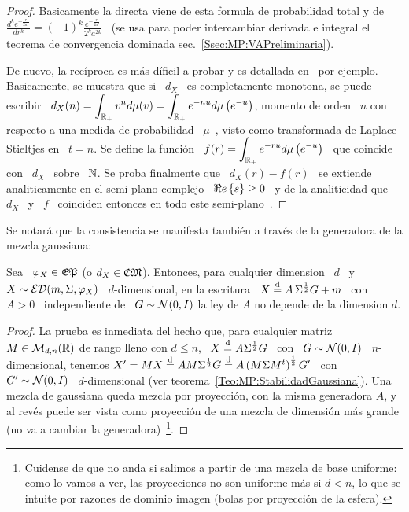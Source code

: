 \begin{proof}
  Basicamente la  directa viene  de esta  formula de probabilidad  total y  de \
  $\displaystyle     \frac{d^k    e^{-\frac{r}{2    a^2}}}{dr^k}     =    (-1)^k
  \frac{e^{-\frac{r}{2 a^2}}}{2^k  a^{2 k}}$ \  (se usa para  poder intercambiar
  derivada    e     integral    el    teorema     de    convergencia    dominada
  sec.~\ref{Ssec:MP:VAPreliminaria}).

  De  nuevo,  la  rec\'iproca  es  m\'as  d\'ificil  a  probar  y  es  detallada
  en~\cite[\S~12]{Wid46} por ejemplo.  Basicamente, se  muestra que si \ $d_X$ \
  es  completamente  monotona,  se  puede  escribir \  $\displaystyle  d_X(n)  =
  \int_{\mathbb{R}_+}  v^n  d\mu(v)  =  \int_{\mathbb{R}_+}  e^{-n  u}  d\mu\left(  e^{-u}
  \right)$, momento de  orden \ $n$ con respecto a una  medida de probabilidad \
  $\mu$~\cite{Hau21:I, Hau21:II},  visto como transformada  de Laplace-Stieltjes
  en \ $t  = n$.  Se define la funci\'on \  $\displaystyle f(r) = \int_{\mathbb{R}_+}
  e^{- r  u} d\mu\left( e^{-u}  \right)$ \  que coincide con  \ $d_X$ \  sobre \
  $\mathbb{N}$.   Se  proba   finalmente  que  \  $d_X(r)  -   f(r)$  \  se  extiende
  analiticamente  en el  semi  plano  complejo \  $\Re e \left\{ s \right\}  \ge 0$  \  y de  la
  analiticidad  que  \ $d_X$  \  y  \ $f$  \  coinciden  entonces  en todo  este
  semi-plano~\cite{Car21, CarKro05}.
\end{proof}

Se  notar\'a  que  la consistencia  se  manifesta  tambi\'en  a trav\'es  de  la
generadora de la mezcla gaussiana:
%
\begin{lema}\label{Lem:MP:AIndependienteD}
  Sea  \ $\varphi_X  \in  \mathfrak{EP}$ (o  $d_X  \in \mathfrak{CM}$).  Entonces, para  cualquier
  dimension \ $d$ \ y  $X \sim \mathcal{ED}(m,\Sigma,\varphi_X)$ \ $d$-dimensional, en la
  escritura  \ $X  \stackrel{\mathrm{d}}{=}  A \,  \Sigma^{\frac12} G  +  m$ \  con  \ $A  > 0$  \
  independiente de \ $G  \sim \mathcal{N}(0,I)$ la ley de $A$ no  depende de la dimension
  $d$.
\end{lema}
%
\begin{proof}
  La  prueba  es  inmediata  del   hecho  que,  para  cualquier  matriz  $M  \in
  \mathcal{M}_{d,n}(\mathbb{R})$ de rango lleno con $d  \le n$, \ $X \stackrel{\mathrm{d}}{=} A \Sigma^{\frac12}
  G $ \ con  \ $G \sim \mathcal{N}(0,I)$ \ $n$-dimensional, tenemos $X' =  M X \stackrel{\mathrm{d}}{=} A M
  \Sigma^{\frac12} G \stackrel{\mathrm{d}}{=} A \left( M  \Sigma M^t \right)^{\frac12} G'$ \ con \
  $G'         \sim        \mathcal{N}(0,I)$         \         $d$-dimensional        (ver
  teorema~\ref{Teo:MP:StabilidadGaussiana}).  Una   mezcla  de  gaussiana  queda
  mezcla por proyecci\'on,  con la misma generadora $A$, y  al rev\'es puede ser
  vista como  proyecci\'on de una  mezcla de dimensi\'on  m\'as grande (no  va a
  cambiar la generadora)~\footnote{Cuidense  de que no anda si  salimos a partir
    de una mezcla de base uniforme: como lo vamos a ver, las proyecciones no son
    uniforme m\'as si $d  < n$, lo que se intuite por  razones de dominio imagen
    (bolas por proyecci\'on de la esfera).}.
\end{proof}

